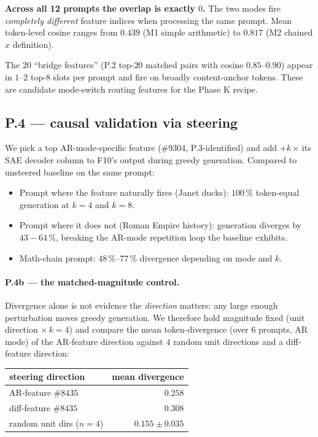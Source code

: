 \textbf{Across all 12 prompts the overlap is exactly $0$.} The two
modes fire \emph{completely different} feature indices when
processing the same prompt. Mean token-level cosine ranges from
$0.439$ (M1 simple arithmetic) to $0.817$ (M2 chained $x$ definition).

The $20$ ``bridge features'' (P.2 top-$20$ matched pairs with cosine
$0.85$--$0.90$) appear in $1$--$2$ top-$8$ slots per prompt and
fire on broadly content-anchor tokens. These are candidate
mode-switch routing features for the Phase K recipe.

\subsection{P.4 — causal validation via steering}

We pick a top AR-mode-specific feature (\#9304, P.3-identified) and
add $+k$\,$\times$ its SAE decoder column to F10's 
output during greedy generation. Compared to unsteered baseline on
the same prompt:

\begin{itemize}
  \setlength\itemsep{2pt}
  \item Prompt where the feature naturally fires (Janet ducks):
        $100$\,\% token-equal generation at $k\!=\!4$ and $k\!=\!8$.
  \item Prompt where it does not (Roman Empire history): generation
        diverges by $43\!-\!64$\,\%, breaking the AR-mode repetition
        loop the baseline exhibits.
  \item Math-chain prompt: $48$\,\%--$77$\,\% divergence depending on
        mode and $k$.
\end{itemize}

\paragraph{P.4b --- the matched-magnitude control.}
Divergence alone is not evidence the \emph{direction} matters: any
large enough perturbation moves greedy generation. We therefore hold
magnitude fixed (unit direction $\times\,k{=}4$) and compare the
mean token-divergence (over $6$ prompts, AR mode) of the AR-feature
direction against $4$ random unit directions and a diff-feature
direction:

\begin{center}
\begin{tabular}{lr}
\toprule
steering direction & mean divergence \\
\midrule
AR-feature \#$8435$ & $0.258$ \\
diff-feature \#$8435$ & $0.308$ \\
random unit dirs ($n{=}4$) & $0.155 \pm 0.035$ \\
\bottomrule
\end{tabular}
\end{center}

